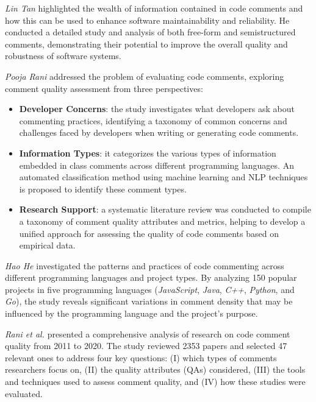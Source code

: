 \noindent \textit{Lin Tan} \cite{TAN2015493} highlighted the wealth of information contained in code comments and how this can be used to enhance software maintainability and reliability. He conducted a detailed study and analysis of both free-form and semistructured comments, demonstrating their potential to improve the overall quality and robustness of software systems.

\noindent \textit{Pooja Rani} \cite{Rani2021} addressed the problem of evaluating code comments, exploring comment quality assessment from three perspectives:
\begin{itemize}
	\item \textbf{Developer Concerns}: the study investigates what developers ask about commenting practices, identifying a taxonomy of common concerns and challenges faced by developers when writing or generating code comments.
	\item \textbf{Information Types}: it categorizes the various types of information embedded in class comments across different programming languages. An automated classification method using machine learning and NLP techniques is proposed to identify these comment types.
	\item \textbf{Research Support}: a systematic literature review was conducted to compile a taxonomy of comment quality attributes and metrics, helping to develop a unified approach for assessing the quality of code comments based on empirical data.
\end{itemize}

\noindent \textit{Hao He} \cite{HaoHe19} investigated the patterns and practices of code commenting across different programming languages and project types. By analyzing 150 popular projects in five programming languages (\textit{JavaScript}, \textit{Java}, \textit{C++}, \textit{Python}, and \textit{Go}), the study reveals significant variations in comment density that may be influenced by the programming language and the project's purpose.

\noindent \textit{Rani et al.}\cite{Rani2023} presented a comprehensive analysis of research on code comment quality from 2011 to 2020. The study reviewed 2353 papers and selected 47 relevant ones to address four key questions: (I) which types of comments researchers focus on, (II) the quality attributes (QAs) considered, (III) the tools and techniques used to assess comment quality, and (IV) how these studies were evaluated.